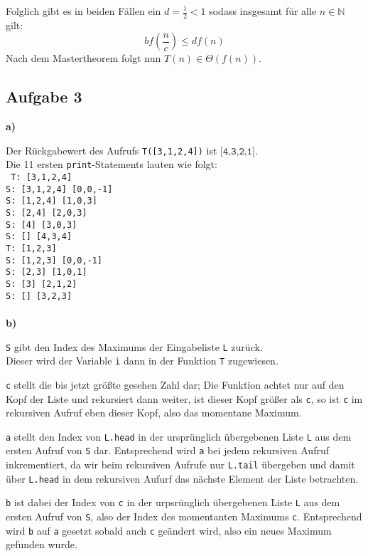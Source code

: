 \documentclass[a4paper,graphics,11pt]{article}
\newcommand{\aufgabe}[1]{\subsection*{Aufgabe #1}}
\begin{document}
Folglich gibt es in beiden Fällen ein $d = \frac{1}{2} < 1$ sodass insgesamt für alle $n \in \mathbb{N}$ gilt:
$$
    bf(\frac{n}{c} ) \leq d f(n)
$$
Nach dem Mastertheorem folgt nun $T(n) \in \Theta(f(n))$.

\newpage
\aufgabe{3}
\textbf{a)}

Der Rückgabewert des Aufrufs \texttt{T([3,1,2,4])} ist $\texttt{[4,3,2,1]}$.\\
Die 11 ersten \texttt{print}-Statements lauten wie folgt:\\
\texttt{
    T: [3,1,2,4] \\
    S: [3,1,2,4] [0,0,-1]\\
    S: [1,2,4] [1,0,3]\\
    S: [2,4] [2,0,3]\\
    S: [4] [3,0,3]\\
    S: [] [4,3,4]\\
    T: [1,2,3]\\
    S: [1,2,3] [0,0,-1]\\
    S: [2,3] [1,0,1]\\
    S: [3] [2,1,2]\\
    S: [] [3,2,3]\\
}\\
\textbf{b)}

\texttt{S} gibt den Index des Maximums der Eingabeliste \texttt{L} zurück.\\
Dieser wird der Variable \texttt{i} dann in der Funktion \texttt{T} zugewiesen.

\texttt{c} stellt die bis jetzt größte gesehen Zahl dar; Die Funktion achtet nur auf den
Kopf der Liste und rekursiert dann weiter, ist dieser Kopf größer als \texttt{c}, so ist
\texttt{c} im rekursiven Aufruf eben dieser Kopf, also das momentane Maximum.

\texttt{a} stellt den Index von \texttt{L.head} in der ursprünglich übergebenen Liste \texttt{L} aus dem
ersten Aufruf von \texttt{S} dar. Entsprechend wird \texttt{a} bei jedem rekursiven Aufruf inkrementiert,
da wir beim rekursiven Aufrufe nur \texttt{L.tail} übergeben und damit über \texttt{L.head} in dem
rekursiven Aufurf das nächste Element der Liste betrachten.

\texttt{b} ist dabei der Index von \texttt{c} in der urpsrünglich übergebenen Liste \texttt{L} aus dem
ersten Aufruf von \texttt{S}, also der Index des momentanten Maximums \texttt{c}.
Entsprechend wird \texttt{b} auf \texttt{a} gesetzt sobald auch
\texttt{c} geändert wird, also ein neues Maximum gefunden wurde.
\end{document}

